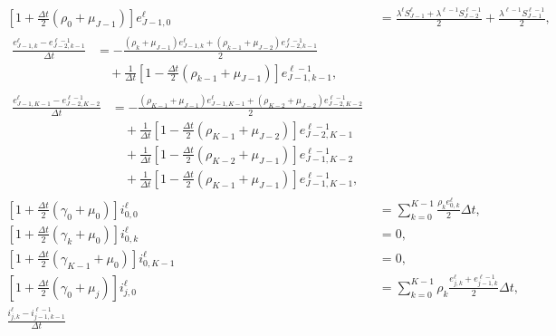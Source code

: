 \documentclass[USenglish]{article}
\begin{document}
\begin{subequations}
\begin{align}
    \\
    \left[1 + \frac{\Delta t}{2} (\rho_0 + \mu_{J - 1})\right] e_{J - 1, 0}^{\ell}
    &=
    \frac{\lambda^{\ell} S_{J - 1}^{\ell}
      + \lambda^{\ell - 1} S_{J - 2}^{\ell - 1}}
    {2}
    + \frac{\lambda^{\ell - 1} S_{J - 1}^{\ell - 1}}{2},
    \\
    \begin{split}
      \frac{e_{J - 1, k}^{\ell} - e_{J - 2, k - 1}^{\ell - 1}}{\Delta t}
      &= - \frac{(\rho_k + \mu_{J - 1}) e_{J - 1, k}^{\ell}
        + (\rho_{k - 1} + \mu_{J - 2}) e_{J - 2, k - 1}^{\ell - 1}}
      {2}
      \\ & \quad {}
      + \frac{1}{\Delta t} \left[
        1 - \frac{\Delta t}{2} (\rho_{k - 1} + \mu_{J - 1})
      \right] e_{J - 1, k - 1}^{\ell - 1},
    \end{split}
    \\
    \begin{split}
      \frac{e_{J - 1, K - 1}^{\ell} - e_{J - 2, K - 2}^{\ell - 1}}{\Delta t}
      &= - \frac{(\rho_{K - 1} + \mu_{J - 1}) e_{J - 1, K - 1}^{\ell}
        + (\rho_{K - 2} + \mu_{J - 2}) e_{J - 2, K - 2}^{\ell - 1}}
      {2}
      \\ & \quad {}
      + \frac{1}{\Delta t} \left[
        1 - \frac{\Delta t}{2} (\rho_{K - 1} + \mu_{J - 2})
      \right] e_{J - 2, K - 1}^{\ell - 1}
      \\ & \quad {}
      + \frac{1}{\Delta t} \left[
        1 - \frac{\Delta t}{2} (\rho_{K - 2} + \mu_{J - 1})
      \right] e_{J - 1, K - 2}^{\ell - 1}
      \\ & \quad {}
      + \frac{1}{\Delta t} \left[
        1 - \frac{\Delta t}{2} (\rho_{K - 1} + \mu_{J - 1})
      \right] e_{J - 1, K - 1}^{\ell - 1},
    \end{split}
    \\
    \left[1 + \frac{\Delta t}{2} (\gamma_0 + \mu_0)\right] i_{0, 0}^{\ell}
    &= \sum_{k = 0}^{K - 1} \frac{\rho_k e_{0, k}^{\ell}} {2}
    \Delta t,
    \\
    \left[1 + \frac{\Delta t}{2} (\gamma_k + \mu_0)\right] i_{0, k}^{\ell}
    &= 0,
    \\
    \left[1 + \frac{\Delta t}{2} (\gamma_{K - 1} + \mu_0)\right]
    i_{0, K - 1}^{\ell}
    &= 0,
    \\
    \left[1 + \frac{\Delta t}{2} (\gamma_0 + \mu_j)\right] i_{j, 0}^{\ell}
    &= \sum_{k = 0}^{K - 1} \rho_k
    \frac{e_{j, k}^{\ell} + e_{j - 1, k}^{\ell - 1}} {2}
    \Delta t,
    \\
    \frac{i_{j, k}^{\ell} - i_{j - 1, k - 1}^{\ell - 1}}{\Delta t}

\end{align}
\end{subequations}
\end{document}

